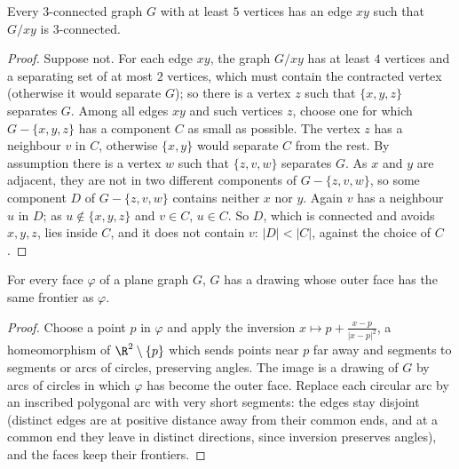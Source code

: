 \begin{lemma}[Thomassen, 1980]\label{lem:contractible}
Every $3$-connected graph $G$ with at least $5$ vertices has an edge $xy$ such that $G/xy$ is $3$-connected.
\end{lemma}
\begin{proof}
Suppose not. For each edge $xy$, the graph $G/xy$ has at least $4$ vertices and a separating set of at most $2$ vertices, which must contain the
contracted vertex (otherwise it would separate $G$); so there is a vertex $z$ such that $\{x,y,z\}$ separates $G$. Among all edges $xy$ and such vertices $z$, choose
one for which $G-\{x,y,z\}$ has a component $C$ as small as possible. The vertex $z$ has a neighbour $v$ in $C$, otherwise $\{x,y\}$ would separate $C$ from the rest.
By assumption there is a vertex $w$ such that $\{z,v,w\}$ separates $G$. As $x$ and $y$ are adjacent, they are not in two different components of $G-\{z,v,w\}$, so
some component $D$ of $G-\{z,v,w\}$ contains neither $x$ nor $y$. Again $v$ has a neighbour $u$ in $D$; as $u\notin\{x,y,z\}$ and $v\in C$, $u\in C$. So $D$, which is connected and avoids
$x,y,z$, lies inside $C$, and it does not contain $v$: $|D|<|C|$, against the choice of $C$.
\end{proof}

\begin{lemma}\label{lem:facechoice}
For every face $\varphi$ of a plane graph $G$, $G$ has a drawing whose outer face has the same frontier as $\varphi$.
\end{lemma}
\begin{proof}
Choose a point $p$ in $\varphi$ and apply the inversion $x\mapsto p+\frac{x-p}{|x-p|^2}$, a homeomorphism of $\R^2\setminus\{p\}$ which sends points near $p$ far away and
segments to segments or arcs of circles, preserving angles. The image is a drawing of $G$ by arcs of circles in which $\varphi$ has become the outer face. Replace
each circular arc by an inscribed polygonal arc with very short segments: the edges stay disjoint (distinct edges are at positive distance
away from their common ends, and at a common end they leave in distinct directions, since inversion preserves angles), and the faces keep
their frontiers.
\end{proof}

